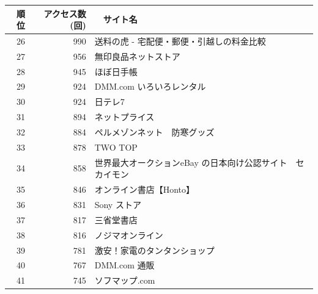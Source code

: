 \begin{table}[htb]

\setlength{\myranking}{0.7cm}
  \begin{center}

\begin{tabular}{|r|r|p{30em}|}
\hline


	順位 & アクセス数(回) &　サイト名  \\ \hline \hline


	\parbox[c][\myranking][c]{0cm}{}
	26 & 990 &送料の虎 - 宅配便・郵便・引越しの料金比較  \\

	\parbox[c][\myranking][c]{0cm}{}
	27 & 956 &無印良品ネットストア  \\

	\parbox[c][\myranking][c]{0cm}{}
	28 & 945 &ほぼ日手帳  \\

	\parbox[c][\myranking][c]{0cm}{}
	29 & 924 & DMM.com いろいろレンタル \\

	\parbox[c][\myranking][c]{0cm}{}
	30 & 924 & 日テレ7 \\
	\hline
	\parbox[c][\myranking][c]{0cm}{}
	31 & 894 &ネットプライス \\

	\parbox[c][\myranking][c]{0cm}{}
	32 & 884 & ペルメゾンネット　防寒グッズ \\

	\parbox[c][\myranking][c]{0cm}{}
	33 & 878 &TWO TOP \\

	\parbox[c][\myranking][c]{0cm}{}
	34 & 858 & 世界最大オークションeBay の日本向け公認サイト　セカイモン \\

	\parbox[c][\myranking][c]{0cm}{}
	35 & 846 & オンライン書店【Honto】 \\
	\hline
	\parbox[c][\myranking][c]{0cm}{}
	36 & 831 & Sony ストア \\

	\parbox[c][\myranking][c]{0cm}{}
	37 & 817 & 三省堂書店 \\

	\parbox[c][\myranking][c]{0cm}{}
	38 & 816 & ノジマオンライン \\

	\parbox[c][\myranking][c]{0cm}{}
	39 & 781 & 激安！家電のタンタンショップ \\

	\parbox[c][\myranking][c]{0cm}{}
	40 & 767 & DMM.com 通販 \\
	\hline
	\parbox[c][\myranking][c]{0cm}{}
	41 & 745 & ソフマップ.com \\


\end{tabular}
\end{center}
\end{table}
